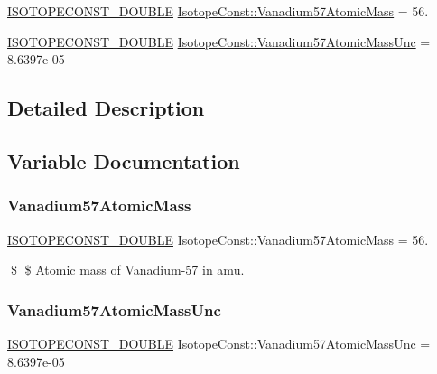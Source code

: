 \begin{DoxyCompactItemize}
\item 
\mbox{\hyperlink{group___isotope_const-_macros_ga8f45a7272ce02c0b4c65c44636ed719a}{I\+S\+O\+T\+O\+P\+E\+C\+O\+N\+S\+T\+\_\+\+D\+O\+U\+B\+LE}} \mbox{\hyperlink{group___isotope_const-_vanadium-_v57_ga6654aff5391e8af8f397d7cb0dc257ab}{Isotope\+Const\+::\+Vanadium57\+Atomic\+Mass}} = 56.
\item 
\mbox{\hyperlink{group___isotope_const-_macros_ga8f45a7272ce02c0b4c65c44636ed719a}{I\+S\+O\+T\+O\+P\+E\+C\+O\+N\+S\+T\+\_\+\+D\+O\+U\+B\+LE}} \mbox{\hyperlink{group___isotope_const-_vanadium-_v57_ga670ee790f1639cf6f4b7d12c723497be}{Isotope\+Const\+::\+Vanadium57\+Atomic\+Mass\+Unc}} = 8.\+6397e-\/05
\end{DoxyCompactItemize}


\subsection{Detailed Description}


\subsection{Variable Documentation}
\mbox{\label{group___isotope_const-_vanadium-_v57_ga6654aff5391e8af8f397d7cb0dc257ab}} 
\subsubsection{\texorpdfstring{Vanadium57\+Atomic\+Mass}{Vanadium57AtomicMass}}
{\footnotesize\ttfamily \mbox{\hyperlink{group___isotope_const-_macros_ga8f45a7272ce02c0b4c65c44636ed719a}{I\+S\+O\+T\+O\+P\+E\+C\+O\+N\+S\+T\+\_\+\+D\+O\+U\+B\+LE}} Isotope\+Const\+::\+Vanadium57\+Atomic\+Mass = 56.}

\$ \$ Atomic mass of Vanadium-\/57 in amu. \mbox{\label{group___isotope_const-_vanadium-_v57_ga670ee790f1639cf6f4b7d12c723497be}} 
\subsubsection{\texorpdfstring{Vanadium57\+Atomic\+Mass\+Unc}{Vanadium57AtomicMassUnc}}
{\footnotesize\ttfamily \mbox{\hyperlink{group___isotope_const-_macros_ga8f45a7272ce02c0b4c65c44636ed719a}{I\+S\+O\+T\+O\+P\+E\+C\+O\+N\+S\+T\+\_\+\+D\+O\+U\+B\+LE}} Isotope\+Const\+::\+Vanadium57\+Atomic\+Mass\+Unc = 8.\+6397e-\/05}

